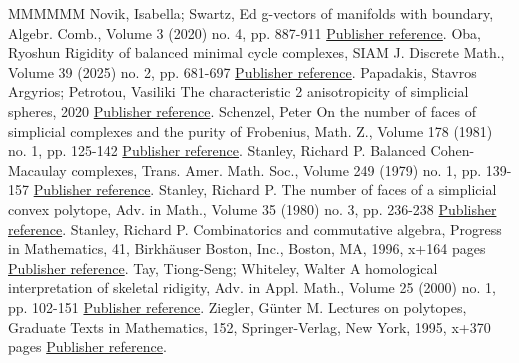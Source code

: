 \documentclass[11pt]{article}
\theoremstyle{definition}
\numberwithin{equation}{section}
\begin{document}
\begin{thebibliography}{MMMMMM}
 Novik, Isabella; Swartz, Ed g-vectors of manifolds with boundary, Algebr. Comb., Volume 3 (2020) no. 4, pp. 887-911 \href{https://alco.centre-mersenne.org/articles/10.5802/alco.419/#NS20}{Publisher reference}.
 Oba, Ryoshun Rigidity of balanced minimal cycle complexes, SIAM J. Discrete Math., Volume 39 (2025) no. 2, pp. 681-697 \href{https://alco.centre-mersenne.org/articles/10.5802/alco.419/#Oba}{Publisher reference}.
 Papadakis, Stavros Argyrios; Petrotou, Vasiliki The characteristic 2 anisotropicity of simplicial spheres, 2020 \href{https://alco.centre-mersenne.org/articles/10.5802/alco.419/#PP}{Publisher reference}.
 Schenzel, Peter On the number of faces of simplicial complexes and the purity of Frobenius, Math. Z., Volume 178 (1981) no. 1, pp. 125-142 \href{https://alco.centre-mersenne.org/articles/10.5802/alco.419/#Sch81}{Publisher reference}.
 Stanley, Richard P. Balanced Cohen-Macaulay complexes, Trans. Amer. Math. Soc., Volume 249 (1979) no. 1, pp. 139-157 \href{https://alco.centre-mersenne.org/articles/10.5802/alco.419/#Sta79}{Publisher reference}.
 Stanley, Richard P. The number of faces of a simplicial convex polytope, Adv. in Math., Volume 35 (1980) no. 3, pp. 236-238 \href{https://alco.centre-mersenne.org/articles/10.5802/alco.419/#Sta80}{Publisher reference}.
 Stanley, Richard P. Combinatorics and commutative algebra, Progress in Mathematics, 41, Birkhäuser Boston, Inc., Boston, MA, 1996, x+164 pages \href{https://alco.centre-mersenne.org/articles/10.5802/alco.419/#Sta-book}{Publisher reference}.
 Tay, Tiong-Seng; Whiteley, Walter A homological interpretation of skeletal ridigity, Adv. in Appl. Math., Volume 25 (2000) no. 1, pp. 102-151 \href{https://alco.centre-mersenne.org/articles/10.5802/alco.419/#TW}{Publisher reference}.
 Ziegler, Günter M. Lectures on polytopes, Graduate Texts in Mathematics, 152, Springer-Verlag, New York, 1995, x+370 pages \href{https://alco.centre-mersenne.org/articles/10.5802/alco.419/#Zie}{Publisher reference}.
\end{thebibliography}
\end{document}
